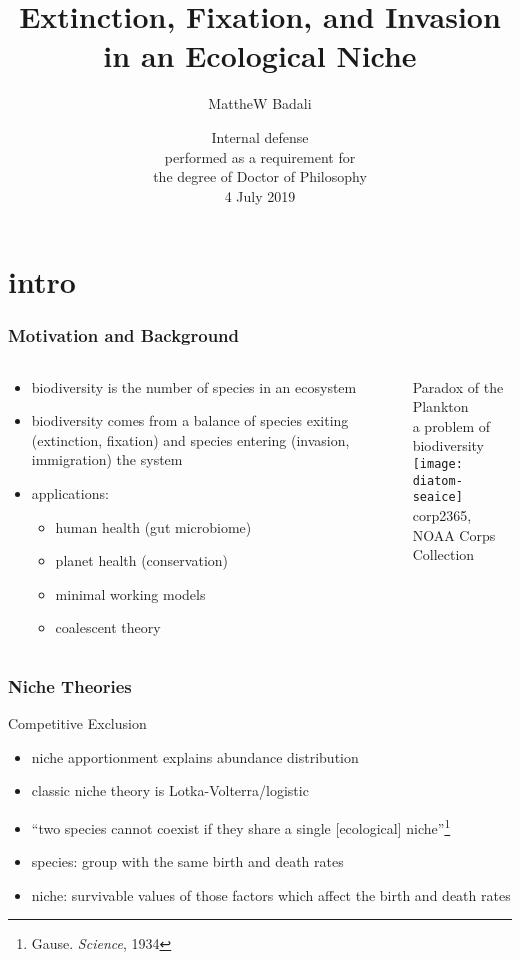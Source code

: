 \documentclass{beamer}
\title[Coexistence and Extinction of Competing Species]{Extinction, Fixation, and Invasion in an Ecological Niche}
\author[M.A.Badali]{MattheW Badali}
\date[04/07/2019]{Internal defense\\
	performed as a requirement for\\
	the degree of Doctor of Philosophy\\
	4 July 2019}
\begin{document}
\frame{\titlepage}


\section[Introduction]{intro}

\begin{frame}
\frametitle{Motivation and Background}
\begin{columns}
	\begin{column}{6.5cm}
		\begin{itemize}
			\item biodiversity is the number of species in an ecosystem
			\item biodiversity comes from a balance of species exiting (extinction, fixation) and species entering (invasion, immigration) the system
			\pause
			\item applications:
			\begin{itemize}
				\item human health (gut microbiome)%
				\item planet health (conservation)%
				\item minimal working models
				\item coalescent theory%
			\end{itemize}
		\end{itemize}
	\end{column}
	\pause
	\begin{column}{4.5cm}
		\begin{center}
			Paradox of the Plankton\\%
			a problem of biodiversity \\
			\texttt{[image: diatom-seaice]} \\
			\tiny{corp2365, NOAA Corps Collection}
		\end{center}
	\end{column}
\end{columns}
\end{frame}


\begin{frame}
\frametitle{Niche Theories}
\large{Competitive Exclusion}
\begin{itemize}
	\item niche apportionment explains abundance distribution
	\item classic niche theory is Lotka-Volterra/logistic
	\pause
	\item``two species cannot coexist if they share a single [ecological] niche''\footnote{Gause. \emph{Science}, 1934}
	\item species: group with the same birth and death rates
	\item niche: survivable values of those factors which affect the birth and death rates
\end{itemize}
\end{frame}
\end{document}
